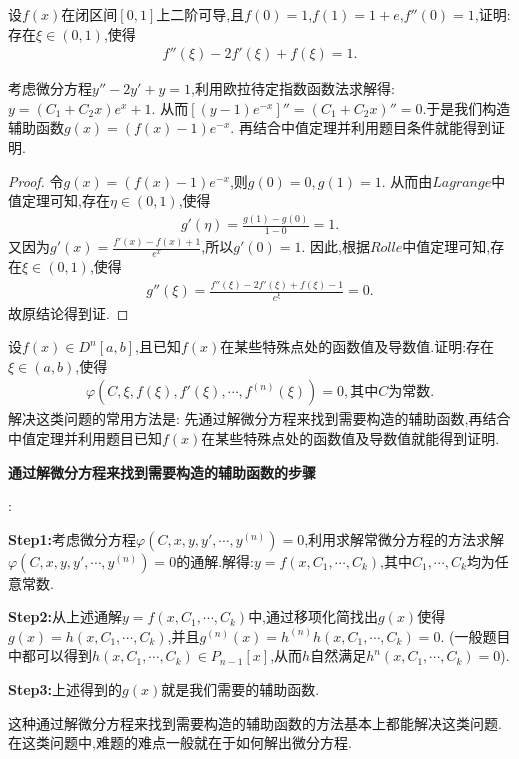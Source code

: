 \documentclass[lang=cn,newtx,10pt,scheme=chinese]{../Template/elegantbook}
\begin{document}
\begin{example}
设\(f(x)\)在闭区间\([0,1]\)上二阶可导,且\(f(0)=1\),\(f(1)=1 + e\),\(f''(0)=1\),证明:存在\(\xi\in(0,1)\),使得
\begin{align*}
f''(\xi)-2f'(\xi)+f(\xi)=1.
\nonumber
\end{align*}
\end{example}
\begin{note}
考虑微分方程$y''-2y'+y=1$,利用欧拉待定指数函数法求解得:$y=(C_1+C_2x)e^x+1$.
从而$[(y-1)e^{-x}]''=(C_1+C_2x)''=0$.于是我们构造辅助函数$g(x)=(f(x)-1)e^{-x}$.
再结合中值定理并利用题目条件就能得到证明.
\end{note}
\begin{proof}
令$g(x)=(f(x)-1)e^{-x}$,则$g(0)=0,g(1)=1$.
从而由$Lagrange$中值定理可知,存在$\eta\in(0,1)$,使得
\begin{align*}
g'(\eta)=\frac{g(1)-g(0)}{1-0}=1.
\nonumber
\end{align*}
又因为$g'(x)=\frac{f'\left( x \right) -f\left( x \right) +1}{e^x}$,所以$g'(0)=1$.
因此,根据$Rolle$中值定理可知,存在$\xi\in(0,1)$,使得
\begin{align*}
g''\left( \xi \right) =\frac{f''\left( \xi \right) -2f'\left( \xi \right) +f\left( \xi \right)-1}{e^{\xi}}=0.
\nonumber
\end{align*}
故原结论得到证.

\end{proof}
\begin{conclusion}
设$f(x)\in D^n\left[ a,b \right]$,且已知$f(x)$在某些特殊点处的函数值及导数值.证明:存在$\xi\in(a,b)$,使得
\begin{align*}
\varphi \left( C,\xi ,f\left( \xi \right) ,f'\left( \xi \right) ,\cdots ,f^{\left( n \right)}\left( \xi \right) \right) =0,\text{其中}C\text{为常数}.
\nonumber
\end{align*}
解决这类问题的常用方法是:
先通过解微分方程来找到需要构造的辅助函数,再结合中值定理并利用题目已知$f(x)$在某些特殊点处的函数值及导数值就能得到证明.

\hypertarget{通过解微分方程来找到需要构造的辅助函数的步骤}{\textbf{通过解微分方程来找到需要构造的辅助函数的步骤}}:

\textbf{Step1:}考虑微分方程$\varphi \left( C,x,y,y',\cdots ,y^{\left( n \right)} \right) =0$,利用求解常微分方程的方法求解$\varphi \left( C,x,y,y',\cdots ,y^{\left( n \right)} \right) =0$的通解.解得:$y=f\left( x,C_1,\cdots ,C_k \right)$,其中$C_1,\cdots,C_k$均为任意常数.

\textbf{Step2:}从上述通解$y=f\left( x,C_1,\cdots ,C_k \right)$中,通过移项化简找出$g(x)$使得$g\left( x \right) =h\left( x,C_1,\cdots ,C_k \right)$,并且$g^{\left( n \right)}\left( x \right) =h^{\left( n \right)}h\left( x,C_1,\cdots ,C_k \right) =0$.
(一般题目中都可以得到$h\left( x,C_1,\cdots ,C_k \right)\in P_{n-1}[x]$,从而$h$自然满足$h^n(x,C_1,\cdots ,C_k)=0$).

\textbf{Step3:}上述得到的$g(x)$就是我们需要的辅助函数.
\end{conclusion}
\begin{remark}
这种通过解微分方程来找到需要构造的辅助函数的方法基本上都能解决这类问题.在这类问题中,难题的难点一般就在于如何解出微分方程.
\end{remark}
\end{document}
